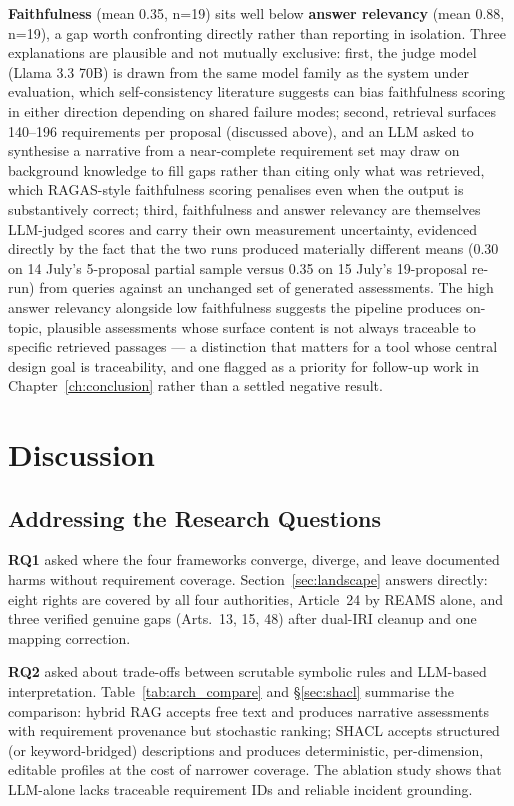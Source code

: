 \textbf{Faithfulness} (mean 0.35, n=19) sits well below \textbf{answer relevancy} (mean 0.88, n=19), a gap worth confronting directly rather than reporting in isolation. Three explanations are plausible and not mutually exclusive: first, the judge model (Llama 3.3 70B) is drawn from the same model family as the system under evaluation, which self-consistency literature suggests can bias faithfulness scoring in either direction depending on shared failure modes; second, retrieval surfaces 140--196 requirements per proposal (discussed above), and an LLM asked to synthesise a narrative from a near-complete requirement set may draw on background knowledge to fill gaps rather than citing only what was retrieved, which RAGAS-style faithfulness scoring penalises even when the output is substantively correct; third, faithfulness and answer relevancy are themselves LLM-judged scores and carry their own measurement uncertainty, evidenced directly by the fact that the two runs produced materially different means (0.30 on 14 July's 5-proposal partial sample versus 0.35 on 15 July's 19-proposal re-run) from queries against an unchanged set of generated assessments. The high answer relevancy alongside low faithfulness suggests the pipeline produces on-topic, plausible assessments whose surface content is not always traceable to specific retrieved passages — a distinction that matters for a tool whose central design goal is traceability, and one flagged as a priority for follow-up work in Chapter~\ref{ch:conclusion} rather than a settled negative result.


\section{Discussion}

\subsection{Addressing the Research Questions}

\textbf{RQ1} asked where the four frameworks converge, diverge, and leave documented harms without requirement coverage. Section~\ref{sec:landscape} answers directly: eight rights are covered by all four authorities, Article~24 by REAMS alone, and three verified genuine gaps (Arts.~13, 15, 48) after dual-IRI cleanup and one mapping correction.

\textbf{RQ2} asked about trade-offs between scrutable symbolic rules and LLM-based interpretation. Table~\ref{tab:arch_compare} and \S\ref{sec:shacl} summarise the comparison: hybrid RAG accepts free text and produces narrative assessments with requirement provenance but stochastic ranking; SHACL accepts structured (or keyword-bridged) descriptions and produces deterministic, per-dimension, editable profiles at the cost of narrower coverage. The ablation study shows that LLM-alone lacks traceable requirement IDs and reliable incident grounding.

